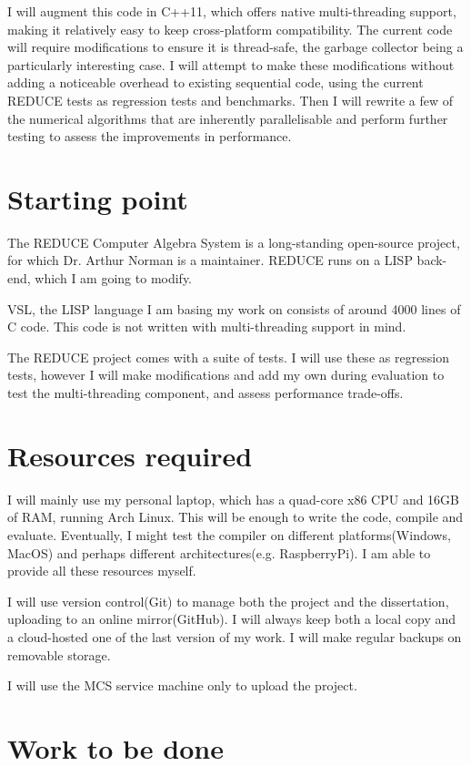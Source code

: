 \documentclass[12pt,a4paper,twoside]{article}
\begin{document}
I will augment this code in C++11, which offers native multi-threading support, making it
relatively easy to keep cross-platform compatibility. The current
code will require modifications to ensure it is thread-safe,
the garbage collector being a particularly interesting case.
I will attempt to make these modifications without adding a
noticeable overhead to existing sequential code, using the current
REDUCE tests as regression tests and benchmarks. Then I will rewrite
a few of the numerical algorithms that are inherently parallelisable
and perform further testing to assess the improvements in performance.

\section*{Starting point}

The REDUCE Computer Algebra System 
is a long-standing open-source
project, for which Dr. Arthur Norman is a maintainer. REDUCE runs on a
LISP back-end, which I am going to modify.

VSL,  the LISP language I am basing my work on consists of around 4000 lines of
C code. This code is not written with multi-threading support in mind. 

The REDUCE project comes with a suite of tests. I will use these as regression tests,
however I will make modifications and add my own during evaluation to test
the multi-threading component, and assess performance trade-offs.

\section*{Resources required}

I will mainly use my personal laptop, which has a quad-core x86 CPU
and 16GB of RAM, running Arch Linux. This will be enough to write the code, compile and evaluate.
Eventually, I might test the compiler on different platforms(Windows, MacOS) and perhaps
different architectures(e.g. RaspberryPi). I am able to provide all these resources myself. 

I will use version control(Git) to manage both the project and the dissertation, uploading
to an online mirror(GitHub). I will always keep both a local copy and a cloud-hosted one of the 
last version of my work. I will make regular backups on removable storage.

I will use the MCS service machine only to upload the project.

\section*{Work to be done}
\end{document}
